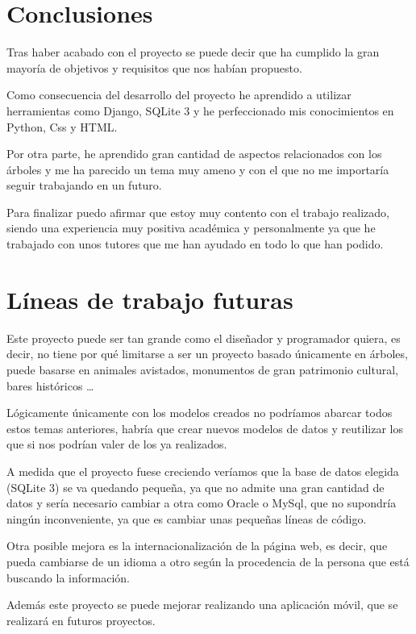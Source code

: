 
\section{Conclusiones} 

Tras haber acabado con el proyecto se puede decir que ha cumplido la gran mayoría de objetivos y requisitos que nos habían propuesto.

Como consecuencia del desarrollo del proyecto he aprendido a utilizar herramientas como Django, SQLite 3 y he perfeccionado mis conocimientos en Python, Css y HTML.

Por otra parte, he aprendido gran cantidad de aspectos relacionados con los árboles y me ha parecido un tema muy ameno y con el que no me importaría seguir trabajando en un futuro.

Para finalizar puedo afirmar que estoy muy contento con el trabajo realizado, siendo una experiencia muy positiva académica y personalmente ya que he trabajado con unos tutores que me han ayudado en todo lo que han podido.

\section{Líneas de trabajo futuras} \label{trabajosFuturos}

Este proyecto puede ser tan grande como el diseñador y programador quiera, es decir, no tiene por qué limitarse a ser un proyecto basado únicamente en árboles, puede basarse en animales avistados, monumentos de gran patrimonio cultural, bares históricos \ldots 

Lógicamente únicamente con los modelos creados no podríamos abarcar todos estos temas anteriores, habría que crear nuevos modelos de datos y reutilizar los que si nos podrían valer de los ya realizados.

A medida que el proyecto fuese creciendo veríamos que la base de datos elegida (SQLite 3) se va quedando pequeña, ya que no admite una gran cantidad de datos y sería necesario cambiar a otra como Oracle o MySql, que no supondría ningún inconveniente, ya que es cambiar unas pequeñas líneas de código.  

Otra posible mejora es la internacionalización de la página web, es decir, que pueda cambiarse de un idioma a otro según la procedencia de la persona que está buscando la información.

Además este proyecto se puede mejorar realizando una aplicación móvil, que se realizará en futuros proyectos.

 
